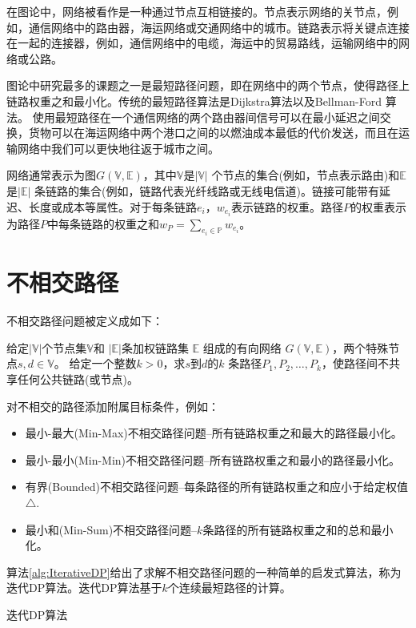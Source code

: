 在图论中，网络被看作是一种通过节点互相链接的。节点表示网络的关节点，例如，通信网络中的路由器，海运网络或交通网络中的城市。链路表示将关键点连接在一起的连接器，例如，通信网络中的电缆，海运中的贸易路线，运输网络中的网络或公路。

图论中研究最多的课题之一是最短路径问题，即在网络中的两个节点，使得路径上链路权重之和最小化。传统的最短路径算法是Dijkstra算法\cite{dijkstra1959note}以及Bellman-Ford 算法\cite{toth2002vehicle,ford2015flows}。 使用最短路径在一个通信网络的两个路由器间信号可以在最小延迟之间交换，货物可以在海运网络中两个港口之间的以燃油成本最低的代价发送，而且在运输网络中我们可以更快地往返于城市之间。

网络通常表示为图$G(\mathbb{V},\mathbb{E})$，其中$\mathbb{V}$是$|\mathbb{V}|$ 个节点的集合(例如，节点表示路由)和$\mathbb{E}$是$|\mathbb{E}|$ 条链路的集合(例如，链路代表光纤线路或无线电信道)。链接可能带有延迟、长度或成本等属性。对于每条链路$e_i$，$w_{e_i}$表示链路的权重。路径$P$的权重表示为路径$P$中每条链路的权重之和$w_P=\sum\limits_{e_i\in \mathbb{P}}w_{e_i}$。
\section{不相交路径}
不相交路径问题被定义成如下：

\begin{definition}[不相交路径问题]
给定$|\mathbb{V}|$个节点集$\mathbb{V}$和 $|\mathbb{E}|$条加权链路集 $\mathbb{E}$ 组成的有向网络 $G(\mathbb{V},\mathbb{E})$，两个特殊节点$s,d\in\mathbb{V}$。 给定一个整数$k>0$，求$s$到$d$的$k$ 条路径$P_1,P_2,\ldots,P_k$，使路径间不共享任何公共链路(或节点)。
\end{definition}

对不相交的路径添加附属目标条件，例如：
\begin{itemize}
  \item 最小-最大(Min-Max)不相交路径问题--所有链路权重之和最大的路径最小化。
  \item 最小-最小(Min-Min)不相交路径问题--所有链路权重之和最小的路径最小化。
  \item 有界(Bounded)不相交路径问题--每条路径的所有链路权重之和应小于给定权值$\bigtriangleup$.
  \item 最小和(Min-Sum)不相交路径问题--$k$条路径的所有链路权重之和的总和最小化。
\end{itemize}
算法\ref{alg:IterativeDP}给出了求解不相交路径问题的一种简单的启发式算法，称为迭代DP算法。迭代DP算法基于$k$个连续最短路径的计算。

\begin{algorithm}[htbp]
{
{
\renewcommand\baselinestretch{1.5}\selectfont %
\caption{迭代DP算法}
\label{alg:IterativeDP}
\begin{algorithmic}[1]
    \ENDFOR
\end{algorithmic}
}
\par}
\end{algorithm}

